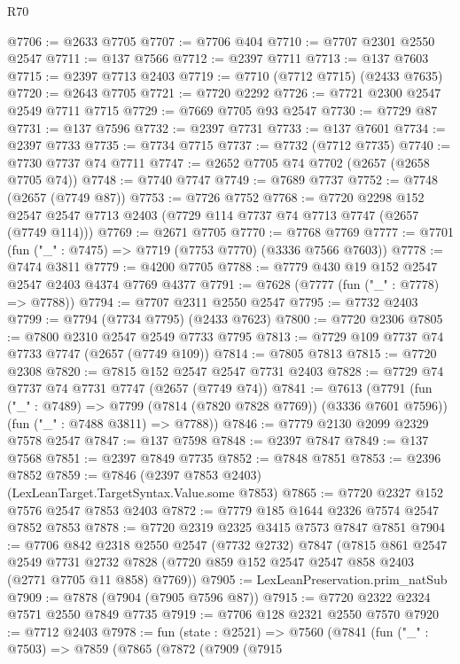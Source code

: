 \begin{lexlean}{R70}
\begin{coremodule}
@7706 := @2633 @7705
@7707 := @7706 @404
@7710 := @7707 @2301 @2550 @2547
@7711 := @137 @7566
@7712 := @2397 @7711
@7713 := @137 @7603
@7715 := @2397 @7713 @2403
@7719 := @7710 (@7712 @7715) (@2433 @7635)
@7720 := @2643 @7705
@7721 := @7720 @2292
@7726 := @7721 @2300 @2547 @2549 @7711 @7715
@7729 := @7669 @7705 @93 @2547
@7730 := @7729 @87
@7731 := @137 @7596
@7732 := @2397 @7731
@7733 := @137 @7601
@7734 := @2397 @7733
@7735 := @7734 @7715
@7737 := @7732 (@7712 @7735)
@7740 := @7730 @7737 @74 @7711
@7747 := @2652 @7705 @74 @7702 (@2657 (@2658 @7705 @74))
@7748 := @7740 @7747
@7749 := @7689 @7737
@7752 := @7748 (@2657 (@7749 @87))
@7753 := @7726 @7752
@7768 := @7720
    @2298
    @152
    @2547
    @2547
    @7713
    @2403
    (@7729 @114 @7737 @74 @7713 @7747 (@2657 (@7749 @114)))
@7769 := @2671 @7705
@7770 := @7768 @7769
@7777 := @7701 (fun ("_" : @7475) => @7719 (@7753 @7770) (@3336 @7566 @7603))
@7778 := @7474 @3811
@7779 := @4200 @7705
@7788 := @7779 @430 @19 @152 @2547 @2547 @2403 @4374 @7769 @4377
@7791 := @7628 (@7777 (fun ("_" : @7778) => @7788))
@7794 := @7707 @2311 @2550 @2547
@7795 := @7732 @2403
@7799 := @7794 (@7734 @7795) (@2433 @7623)
@7800 := @7720 @2306
@7805 := @7800 @2310 @2547 @2549 @7733 @7795
@7813 := @7729 @109 @7737 @74 @7733 @7747 (@2657 (@7749 @109))
@7814 := @7805 @7813
@7815 := @7720 @2308
@7820 := @7815 @152 @2547 @2547 @7731 @2403
@7828 := @7729 @74 @7737 @74 @7731 @7747 (@2657 (@7749 @74))
@7841 := @7613
    (@7791
      (fun ("_" : @7489) => @7799 (@7814 (@7820 @7828 @7769)) (@3336 @7601 @7596))
      (fun ("_" : @7488 @3811) => @7788))
@7846 := @7779 @2130 @2099 @2329 @7578 @2547
@7847 := @137 @7598
@7848 := @2397 @7847
@7849 := @137 @7568
@7851 := @2397 @7849 @7735
@7852 := @7848 @7851
@7853 := @2396 @7852
@7859 := @7846 (@2397 @7853 @2403) (LexLeanTarget.TargetSyntax.Value.some @7853)
@7865 := @7720 @2327 @152 @7576 @2547 @7853 @2403
@7872 := @7779 @185 @1644 @2326 @7574 @2547 @7852 @7853
@7878 := @7720 @2319 @2325 @3415 @7573 @7847 @7851
@7904 := @7706
    @842
    @2318
    @2550
    @2547
    (@7732 @2732)
    @7847
    (@7815
      @861
      @2547
      @2549
      @7731
      @2732
      @7828
      (@7720 @859 @152 @2547 @2547 @858 @2403 (@2771 @7705 @11 @858) @7769))
@7905 := LexLeanPreservation.prim_natSub
@7909 := @7878 (@7904 (@7905 @7596 @87))
@7915 := @7720 @2322 @2324 @7571 @2550 @7849 @7735
@7919 := @7706 @128 @2321 @2550 @7570
@7920 := @7712 @2403
@7978 := fun (state : @2521) =>
  @7560
    (@7841
      (fun ("_" : @7503) =>
      @7859
        (@7865
          (@7872
            (@7909
              (@7915

\end{coremodule}
\end{lexlean}
